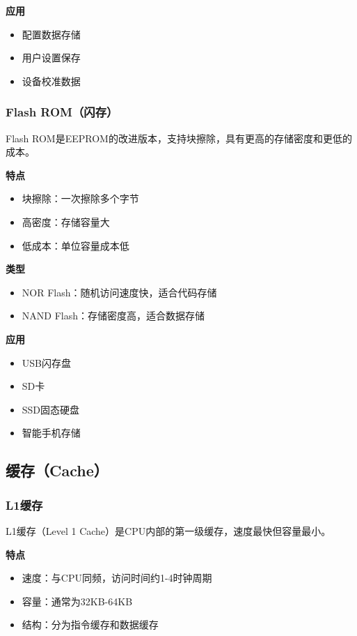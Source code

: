 \documentclass{article}
\begin{document}
\textbf{应用}
\begin{itemize}
    \item 配置数据存储
    \item 用户设置保存
    \item 设备校准数据
\end{itemize}

\subsubsection{Flash ROM（闪存）}

Flash ROM是EEPROM的改进版本，支持块擦除，具有更高的存储密度和更低的成本。

\textbf{特点}
\begin{itemize}
    \item 块擦除：一次擦除多个字节
    \item 高密度：存储容量大
    \item 低成本：单位容量成本低
\end{itemize}

\textbf{类型}
\begin{itemize}
    \item NOR Flash：随机访问速度快，适合代码存储
    \item NAND Flash：存储密度高，适合数据存储
\end{itemize}

\textbf{应用}
\begin{itemize}
    \item USB闪存盘
    \item SD卡
    \item SSD固态硬盘
    \item 智能手机存储
\end{itemize}

\subsection{缓存（Cache）}

\subsubsection{L1缓存}

L1缓存（Level 1 Cache）是CPU内部的第一级缓存，速度最快但容量最小。

\textbf{特点}
\begin{itemize}
    \item 速度：与CPU同频，访问时间约1-4时钟周期
    \item 容量：通常为32KB-64KB
    \item 结构：分为指令缓存和数据缓存
\end{itemize}
\end{document}
